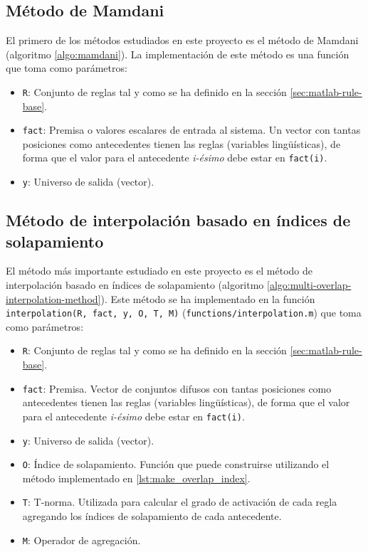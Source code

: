 \subsection{Método de Mamdani}
El primero de los métodos estudiados en este proyecto es el método de Mamdani (algoritmo \ref{algo:mamdani}). La implementación de este método es una función que toma como parámetros:
\begin{itemize}
\item \lstinline|R|: Conjunto de reglas tal y como se ha definido en la sección \ref{sec:matlab-rule-base}.
\item \lstinline|fact|: Premisa o valores escalares de entrada al sistema. Un vector con tantas posiciones como antecedentes tienen las reglas (variables lingüísticas), de forma que el valor para el antecedente \emph{i-ésimo} debe estar en \lstinline|fact(i)|.
\item \lstinline|y|: Universo de salida (vector).
\end{itemize}



\subsection{Método de interpolación basado en índices de solapamiento}
El método más importante estudiado en este proyecto es el método de interpolación basado en índices de solapamiento (algoritmo \ref{algo:multi-overlap-interpolation-method}). Este método se ha implementado en la función \lstinline|interpolation(R, fact, y, O, T, M)| (\lstinline|functions/interpolation.m|) que toma como parámetros:

\begin{itemize}
\item \lstinline|R|: Conjunto de reglas tal y como se ha definido en la sección \ref{sec:matlab-rule-base}.
\item \lstinline|fact|: Premisa. Vector de conjuntos difusos con tantas posiciones como antecedentes tienen las reglas (variables lingüísticas), de forma que el valor para el antecedente \emph{i-ésimo} debe estar en \lstinline|fact(i)|.
\item \lstinline|y|: Universo de salida (vector).
\item \lstinline|O|: Índice de solapamiento. Función que puede construirse utilizando el método implementado en \ref{lst:make_overlap_index}.
\item \lstinline|T|: T-norma. Utilizada para calcular el grado de activación de cada regla agregando los índices de solapamiento de cada antecedente.
\item \lstinline|M|: Operador de agregación.
\end{itemize}

